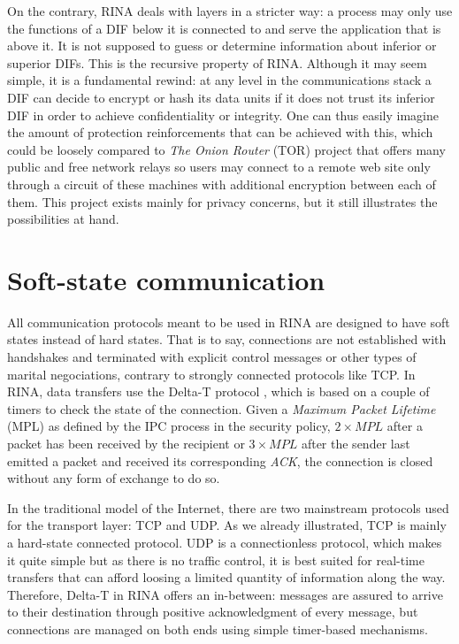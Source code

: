 \documentclass[a4paper]{proc}
\begin{document}
\par On the contrary, RINA deals with layers in a stricter way: a process may
only use the functions of a DIF below it is connected to and serve the
application that is above it. It is not supposed to guess or determine
information about inferior or superior DIFs. This is the recursive property of
RINA. Although it may seem simple, it is a fundamental rewind: at any level in
the communications stack a DIF can decide to encrypt or hash its data units if
it does not trust its inferior DIF in order to achieve confidentiality or
integrity. One can thus easily imagine the amount of protection reinforcements
that can be achieved with this, which could be loosely compared to \textit{The
Onion Router} (TOR) project that offers many public and free network relays so
users may connect to a remote web site only through a circuit of these machines
with additional encryption between each of them. This project exists mainly for
privacy concerns, but it still illustrates the possibilities at hand.

\section{Soft-state communication}

\par All communication protocols meant to be used in RINA are designed to have
soft states instead of hard states. That is to say, connections are not
established with handshakes and terminated with explicit control messages or
other types of marital negociations, contrary to strongly connected protocols
like TCP. In RINA, data transfers use the Delta-T protocol \cite{delta-t}, which
is based on a couple of timers to check the state of the connection. Given a
\textit{Maximum Packet Lifetime} (MPL) as defined by the IPC process in the
security policy, $2 \times MPL$ after a packet has been received by the
recipient or $3 \times MPL$ after the sender last emitted a packet and received
its corresponding \textit{ACK}, the connection is closed without any form of
exchange to do so.

\par In the traditional model of the Internet, there are two mainstream
protocols used for the transport layer: TCP and UDP. As we already illustrated,
TCP is mainly a hard-state connected protocol. UDP is a connectionless protocol,
which makes it quite simple but as there is no traffic control, it is best
suited for real-time transfers that can afford loosing a limited quantity of
information along the way. Therefore, Delta-T in RINA offers an in-between:
messages are assured to arrive to their destination through positive
acknowledgment of every message, but connections are managed on both ends using
simple timer-based mechanisms.
\end{document}
